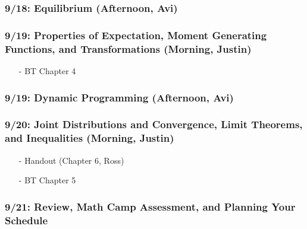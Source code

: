 \documentclass[11pt,letterpaper]{article}
\numberwithin{equation}{section}
\begin{document}
\subsubsection*{9/18: Equilibrium (Afternoon, Avi)}


\subsubsection*{9/19: Properties of Expectation, Moment Generating Functions, and Transformations (Morning, Justin)}

\begin{itemize}
\item[-] BT Chapter 4
\end{itemize}


\subsubsection*{9/19: Dynamic Programming (Afternoon, Avi)} 

\subsubsection*{9/20: Joint Distributions and  Convergence, Limit Theorems, and Inequalities (Morning, Justin)}

\begin{itemize}
\item[-] Handout (Chapter 6, Ross)
\item[-] BT Chapter 5
\end{itemize}


\subsubsection*{9/21: Review, Math Camp Assessment, and Planning Your Schedule }
\end{document}

